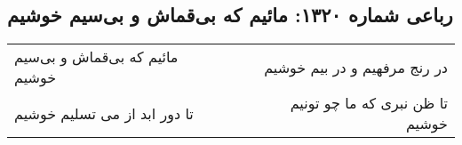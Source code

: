 \begin{center}
\section*{رباعی شماره ۱۳۲۰: مائیم که بی‌قماش و بی‌سیم خوشیم}
\label{sec:1320}
\begin{longtable}{l p{0.5cm} r}
مائیم که بی‌قماش و بی‌سیم خوشیم
&&
در رنج مرفهیم و در بیم خوشیم
\\
تا دور ابد از می تسلیم خوشیم
&&
تا ظن نبری که ما چو تونیم خوشیم
\\
\end{longtable}
\end{center}
